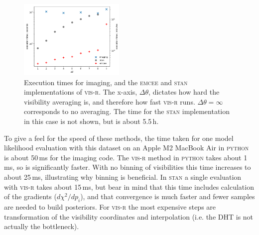 \documentclass[fleqn,usenatbib]{rasti}
\begin{document}
\begin{figure}
    \centering
    \includegraphics[width=0.45\textwidth]{timing.png}
    \caption{Execution times for imaging, and the \textsc{emcee} and \textsc{stan} implementations of \textsc{vis-r}. The x-axis, $\Delta \theta$, dictates how hard the visibility averaging is, and therefore how fast \textsc{vis-r} runs. $\Delta \theta = \infty$ corresponds to no averaging. The time for the \textsc{stan} implementation in this case is not shown, but is about 5.5\,h.}
    \label{fig:timing}
\end{figure}

To give a feel for the speed of these methods, the time taken for one model likelihood evaluation with this dataset on an Apple M2 MacBook Air in \textsc{python} is about 50\,ms for the imaging code. The \textsc{vis-r} method in \textsc{python} takes about 1\,ms, so is significantly faster. With no binning of visibilities this time increases to about 25\,ms, illustrating why binning is beneficial. In \textsc{stan} a single evaluation with \textsc{vis-r} takes about 15\,ms, but bear in mind that this time includes calculation of the gradients ($d \chi^2 / dp_i$), and that convergence is much faster and fewer samples are needed to build posteriors. For \textsc{vis-r} the most expensive steps are transformation of the visibility coordinates and interpolation (i.e. the DHT is not actually the bottleneck).
\end{document}
